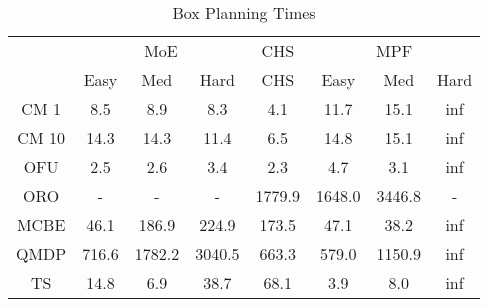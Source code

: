 \begin{table}[]
\centering
\begin{tabular}{|c|c|c|c|c|c|c|c|}
\hline
& \multicolumn{3}{c|}{MoE} & CHS & \multicolumn{3}{c|}{MPF} 
 \\ 
 & Easy & Med & Hard & CHS & Easy & Med & Hard\\\hline
CM 1 &   8.5 &   8.9 &   8.3 &   4.1 &  11.7 &  15.1 & inf\\
\hline
CM 10 &  14.3 &  14.3 &  11.4 &   6.5 &  14.8 &  15.1 & inf\\
\hline
OFU &   2.5 &   2.6 &   3.4 &   2.3 &   4.7 &   3.1 & inf\\
\hline
ORO & - & - & - & 1779.9 & 1648.0 & 3446.8 & -\\
\hline
MCBE &  46.1 & 186.9 & 224.9 & 173.5 &  47.1 &  38.2 & inf\\
\hline
QMDP & 716.6 & 1782.2 & 3040.5 & 663.3 & 579.0 & 1150.9 & inf\\
\hline
TS &  14.8 &   6.9 &  38.7 &  68.1 &   3.9 &   8.0 & inf\\
\hline
\end{tabular}
\caption{Box Planning Times}
\label{tab:experiment_Box_time}
\end{table}
